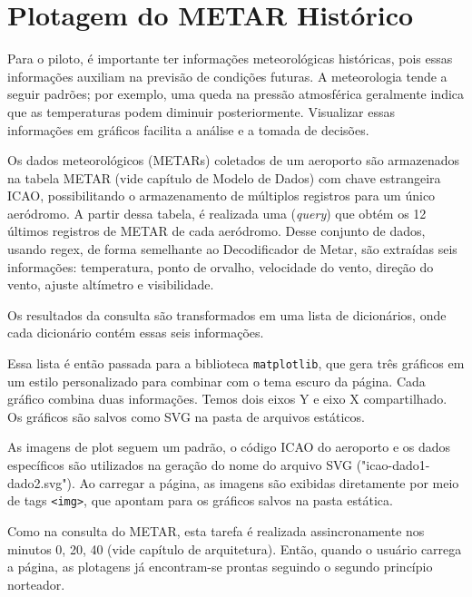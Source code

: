 \chapter{Plotagem do METAR Histórico}

Para o piloto, é importante ter informações meteorológicas históricas, pois 
essas informações auxiliam na previsão de condições futuras. A meteorologia tende 
a seguir padrões; por exemplo, uma queda na pressão atmosférica geralmente indica 
que as temperaturas podem diminuir posteriormente. Visualizar essas 
informações em gráficos facilita a análise e a tomada de decisões.

Os dados meteorológicos (METARs) coletados de um aeroporto são armazenados na tabela
METAR (vide capítulo de Modelo de Dados) com chave estrangeira ICAO, possibilitando
o armazenamento de múltiplos registros para um único aeródromo. A partir dessa 
tabela, é realizada uma (\textit{query}) que obtém os 12 últimos registros 
de METAR de cada aeródromo. Desse conjunto de dados, usando regex, de forma
semelhante ao Decodificador de Metar, são extraídas seis informações: 
temperatura, ponto de orvalho, velocidade do vento, direção do vento, ajuste altímetro e visibilidade.

Os resultados da consulta são transformados em uma lista de dicionários, onde 
cada dicionário contém essas seis informações.




Essa lista é então passada para a biblioteca \texttt{matplotlib}, que gera três 
gráficos em um estilo personalizado para combinar com o tema escuro da página. 
Cada gráfico combina duas informações. Temos dois eixos Y e eixo X compartilhado.
Os gráficos são salvos como SVG na pasta de arquivos estáticos.

As imagens de plot seguem um padrão, o código ICAO do aeroporto e os dados 
específicos são utilizados na geração do nome do arquivo SVG ("icao-dado1-dado2.svg"). 
Ao carregar a página, as imagens são exibidas diretamente por meio de tags \texttt{<img>},
 que apontam para os gráficos salvos na pasta estática.

Como na consulta do METAR, esta tarefa é realizada assincronamente nos 
minutos 0, 20, 40 (vide capítulo de arquitetura). Então, quando o usuário carrega a 
página, as plotagens já encontram-se prontas seguindo o segundo princípio norteador.
